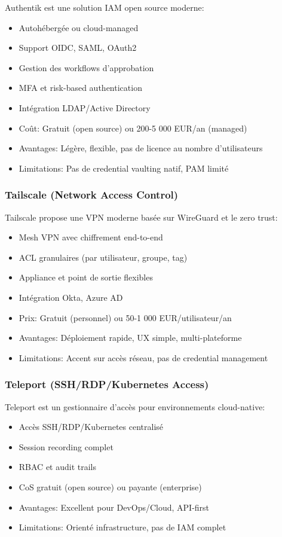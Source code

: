 Authentik est une solution IAM open source moderne:
\begin{itemize}
    \item Autohébergée ou cloud-managed
    \item Support OIDC, SAML, OAuth2
    \item Gestion des workflows d'approbation
    \item MFA et risk-based authentication
    \item Intégration LDAP/Active Directory
    \item Coût: Gratuit (open source) ou 200-5 000 EUR/an (managed)
    \item Avantages: Légère, flexible, pas de licence au nombre d'utilisateurs
    \item Limitations: Pas de credential vaulting natif, PAM limité
\end{itemize}

\subsubsection{Tailscale (Network Access Control)}

Tailscale propose une VPN moderne basée sur WireGuard et le zero trust:
\begin{itemize}
    \item Mesh VPN avec chiffrement end-to-end
    \item ACL granulaires (par utilisateur, groupe, tag)
    \item Appliance et point de sortie flexibles
    \item Intégration Okta, Azure AD
    \item Prix: Gratuit (personnel) ou 50-1 000 EUR/utilisateur/an
    \item Avantages: Déploiement rapide, UX simple, multi-plateforme
    \item Limitations: Accent sur accès réseau, pas de credential management
\end{itemize}

\subsubsection{Teleport (SSH/RDP/Kubernetes Access)}

Teleport est un gestionnaire d'accès pour environnements cloud-native:
\begin{itemize}
    \item Accès SSH/RDP/Kubernetes centralisé
    \item Session recording complet
    \item RBAC et audit trails
    \item CoS gratuit (open source) ou payante (enterprise)
    \item Avantages: Excellent pour DevOps/Cloud, API-first
    \item Limitations: Orienté infrastructure, pas de IAM complet
\end{itemize}

